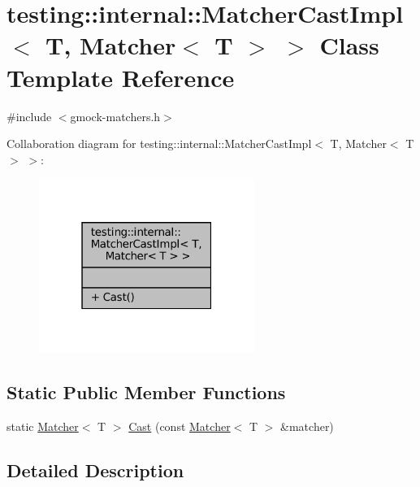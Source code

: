 \hypertarget{classtesting_1_1internal_1_1MatcherCastImpl_3_01T_00_01Matcher_3_01T_01_4_01_4}{}\section{testing\+:\+:internal\+:\+:Matcher\+Cast\+Impl$<$ T, Matcher$<$ T $>$ $>$ Class Template Reference}
\label{classtesting_1_1internal_1_1MatcherCastImpl_3_01T_00_01Matcher_3_01T_01_4_01_4}


{\ttfamily \#include $<$gmock-\/matchers.\+h$>$}



Collaboration diagram for testing\+:\+:internal\+:\+:Matcher\+Cast\+Impl$<$ T, Matcher$<$ T $>$ $>$\+:
\nopagebreak
\begin{figure}[H]
\begin{center}
\leavevmode
\includegraphics[width=199pt]{classtesting_1_1internal_1_1MatcherCastImpl_3_01T_00_01Matcher_3_01T_01_4_01_4__coll__graph}
\end{center}
\end{figure}
\subsection*{Static Public Member Functions}
\begin{DoxyCompactItemize}
\item 
static \hyperlink{classtesting_1_1Matcher}{Matcher}$<$ T $>$ \hyperlink{classtesting_1_1internal_1_1MatcherCastImpl_3_01T_00_01Matcher_3_01T_01_4_01_4_ac945132186fcbe0e0d2d8c207d730026}{Cast} (const \hyperlink{classtesting_1_1Matcher}{Matcher}$<$ T $>$ \&matcher)
\end{DoxyCompactItemize}


\subsection{Detailed Description}
